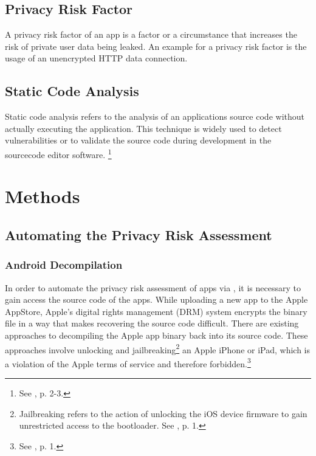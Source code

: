 \documentclass[
	a4paper,
	oneside,
	12pt,
	liststotocnumbered
]{article}
\let\cite\textcite
\begin{document}
\subsection{Privacy Risk Factor}
A privacy risk factor of an app is a factor or a circumstance that increases the risk of private user data being leaked. An example for a privacy risk factor is the usage of an unencrypted HTTP data connection. 

\subsection{Static Code Analysis}

Static code analysis refers to the analysis of an applications source code without actually executing the application. 
This technique is widely used to detect vulnerabilities or to validate the source code during development in the sourcecode editor software. \footnote{See \cite{bardas2010static}, p. 2-3.}

\section{Methods}

\subsection{Automating the Privacy Risk Assessment}

\subsubsection{Android Decompilation}

In order to automate the privacy risk assessment of \mH apps via \sca, it is necessary to gain access the source code of the apps. 
While uploading a new app to the Apple AppStore, Apple's digital rights management (\acs{DRM}) system encrypts the binary file in a way that makes recovering the source code difficult. 
There are existing approaches to decompiling the Apple app binary back into its source code.
These approaches involve unlocking and jailbreaking\footnote{Jailbreaking refers to the action of unlocking the iOS device firmware to gain unrestricted access to the bootloader. See \cite{Kweller2010}, p. 1.}
an Apple iPhone or iPad, which is a violation of the Apple terms of service and therefore forbidden.\footnote{See \cite{Kweller2010}, p. 1.}
\end{document}
